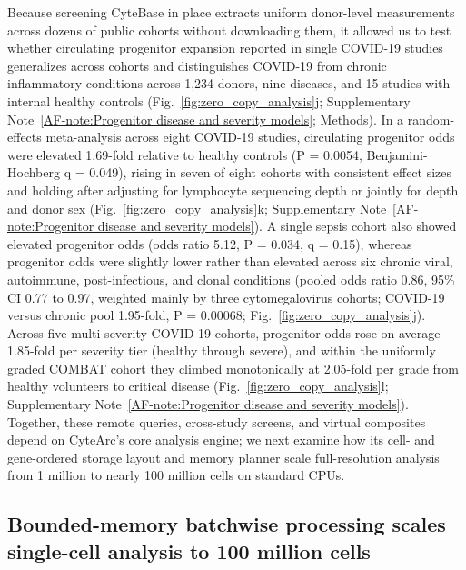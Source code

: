 \documentclass[11pt]{article}
\newcommand{\sref}[1]{\ref*{AF-#1}}
\begin{document}
Because screening CyteBase in place extracts uniform donor-level measurements across dozens of public cohorts without downloading them, it allowed us to test whether circulating progenitor expansion reported in single COVID-19 studies~\cite{stephenson2021singlecell,combat2022blood} generalizes across cohorts and distinguishes COVID-19 from chronic inflammatory conditions across 1,234 donors, nine diseases, and 15 studies with internal healthy controls (Fig.~\ref{fig:zero_copy_analysis}j; Supplementary Note~\sref{note:Progenitor disease and severity models}; Methods). In a random-effects meta-analysis across eight COVID-19 studies, circulating progenitor odds were elevated 1.69-fold relative to healthy controls (P = 0.0054, Benjamini-Hochberg q = 0.049), rising in seven of eight cohorts with consistent effect sizes and holding after adjusting for lymphocyte sequencing depth or jointly for depth and donor sex (Fig.~\ref{fig:zero_copy_analysis}k; Supplementary Note~\sref{note:Progenitor disease and severity models}). A single sepsis cohort also showed elevated progenitor odds (odds ratio 5.12, P = 0.034, q = 0.15), whereas progenitor odds were slightly lower rather than elevated across six chronic viral, autoimmune, post-infectious, and clonal conditions (pooled odds ratio 0.86, 95\% CI 0.77 to 0.97, weighted mainly by three cytomegalovirus cohorts; COVID-19 versus chronic pool 1.95-fold, P = 0.00068; Fig.~\ref{fig:zero_copy_analysis}j). Across five multi-severity COVID-19 cohorts, progenitor odds rose on average 1.85-fold per severity tier (healthy through severe), and within the uniformly graded COMBAT cohort they climbed monotonically at 2.05-fold per grade from healthy volunteers to critical disease (Fig.~\ref{fig:zero_copy_analysis}l; Supplementary Note~\sref{note:Progenitor disease and severity models}). Together, these remote queries, cross-study screens, and virtual composites depend on CyteArc's core analysis engine; we next examine how its cell- and gene-ordered storage layout and memory planner scale full-resolution analysis from 1 million to nearly 100 million cells on standard CPUs.

\subsection*{Bounded-memory batchwise processing scales single-cell analysis to 100 million cells}\label{sec:Fast & Scalable analysis}
\end{document}
